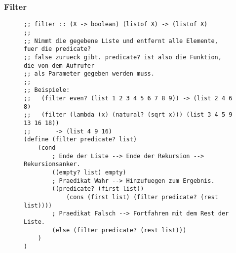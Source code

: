 	\subsubsection{Filter}
		\begin{figure}[H]
			\centering
			\begin{lstlisting}[language = Racket]
;; filter :: (X -> boolean) (listof X) -> (listof X)
;;
;; Nimmt die gegebene Liste und entfernt alle Elemente, fuer die predicate?
;; false zurueck gibt. predicate? ist also die Funktion, die von dem Aufrufer
;; als Parameter gegeben werden muss.
;;
;; Beispiele:
;;   (filter even? (list 1 2 3 4 5 6 7 8 9)) -> (list 2 4 6 8)
;;   (filter (lambda (x) (natural? (sqrt x))) (list 3 4 5 9 13 16 18))
;;       -> (list 4 9 16)
(define (filter predicate? list)
	(cond
		; Ende der Liste --> Ende der Rekursion --> Rekursionsanker.
		((empty? list) empty)
		; Praedikat Wahr --> Hinzufuegen zum Ergebnis.
		((predicate? (first list))
			(cons (first list) (filter predicate? (rest list))))
		; Praedikat Falsch --> Fortfahren mit dem Rest der Liste.
		(else (filter predicate? (rest list)))
	)
)
\end{lstlisting}
		\end{figure}
